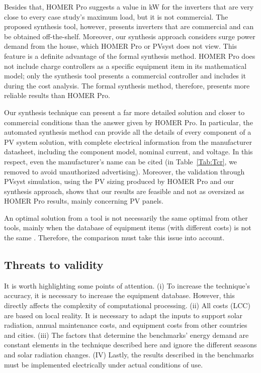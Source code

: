 \documentclass[10pt,journal,compsoc]{IEEEtran}
\begin{document}
Besides that, HOMER Pro suggests a value in kW for the inverters that are very close to every case study's maximum load, but it is not commercial. The proposed synthesis tool, however, presents inverters that are commercial and can be obtained off-the-shelf. Moreover, our synthesis approach considers surge power demand from the house, which HOMER Pro or PVsyst does not view. This feature is a definite advantage of the formal synthesis method. HOMER Pro does not include charge controllers as a specific equipment item in its mathematical model; only the synthesis tool presents a commercial controller and includes it during the cost analysis. The formal synthesis method, therefore, presents more reliable results than HOMER Pro.

Our synthesis technique can present a far more detailed solution and closer to commercial conditions than the answer given by HOMER Pro. In particular, the automated synthesis method can provide all the details of every component of a PV system solution, with complete electrical information from the manufacturer datasheet, including the component model, nominal current, and voltage. In this respect, even the manufacturer's name can be cited (in Table~\ref{Tab:Tcr}, we removed to avoid unauthorized advertising). Moreover, the validation through PVsyst simulation, using the PV sizing produced by HOMER Pro and our synthesis approach, shows that our results are feasible and not as oversized as HOMER Pro results, mainly concerning PV panels.

An optimal solution from a tool is not necessarily the same optimal from other tools, mainly when the database of equipment items (with different costs) is not the same \cite{Alsadi2018}. Therefore, the comparison must take this issue into account. 

\subsection{Threats to validity} 

It is worth highlighting some points of attention. (i) To increase the technique's accuracy, it is necessary to increase the equipment database. However, this directly affects the complexity of computational processing. (ii) All costs (LCC) are based on local reality. It is necessary to adapt the inputs to support solar radiation, annual maintenance costs, and equipment costs from other countries and cities. (iii) The factors that determine the benchmarks' energy demand are constant elements in the technique described here and ignore the different seasons and solar radiation changes. (IV) Lastly, the results described in the benchmarks must be implemented electrically under actual conditions of use.
\end{document}
